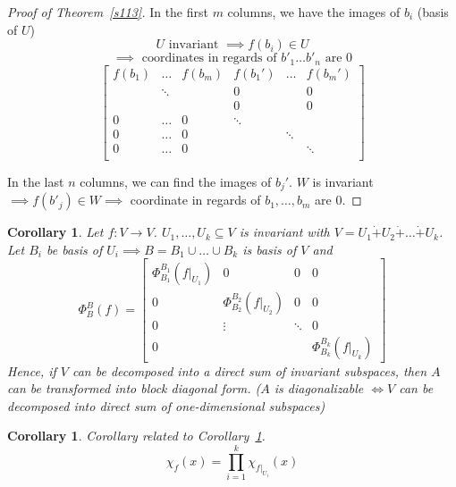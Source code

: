 \documentclass{article}
\newcounter{lecref}[section]
\numberwithin{lecref}{section}
\newtheorem{corollary}[lecref]{Corollary}
\begin{document}
\begin{proof}[Proof of Theorem~\ref{s113}]\hfill{}
  In the first $m$ columns, we have the images of $b_i$ (basis of $U$)
  \[ U \text{ invariant } \implies f(b_i) \in U \]
  \[ \implies \text{ coordinates in regards of } b'_1 \dots b'_n \text{ are } 0 \]
  \[
    \begin{bmatrix}
      f(b_1) & \dots  & f(b_m) & f(b_1') & \dots  & f(b_m') \\
             & \ddots &        & 0       &        & 0 \\
             &        &        & 0       &        & 0 \\
      0      & \dots  & 0      & \ddots  &        & \\
      0      & \dots  & 0      &         & \ddots & \\
      0      & \dots  & 0      &         &        & \ddots \\
    \end{bmatrix}
  \]

  In the last $n$ columns, we can find the images of $b_j'$.
  $W$ is invariant $\implies f(b'_j) \in W \implies$ coordinate in regards of $b_1, \dots, b_m$ are $0$.
\end{proof}

\begin{corollary} %
  \label{k116}
  Let $f: V \to V$. $U_1, \dots, U_k \subseteq V$ is invariant with $V = U_1 \dot+ U_2 \dot+ \dots \dot+ U_k$.
  Let $B_i$ be basis of $U_i \implies B = B_1 \cup \dots \cup B_k$ is basis of $V$ and
  \[
    \Phi_B^B(f) = \left[\begin{array}{c|ccc}
      \Phi_{B_1}^{B_1}(f|_{U_1}) & 0 & 0 & 0 \\
    \hline
      0 & \Phi_{B_2}^{B_2}(f|_{U_2}) & 0 & 0 \\
      0 & \vdots & \ddots & 0 \\
      0 &   &  & \Phi_{B_k}^{B_k}(f|_{U_k})
    \end{array}\right]
  \]
  Hence, if $V$ can be decomposed into a direct sum of invariant subspaces, then $A$ can be transformed into block diagonal form.
  ($A$ is diagonalizable $\iff V$ can be decomposed into direct sum of one-dimensional subspaces)
\end{corollary}

\begin{corollary} %
  Corollary related to Corollary~\ref{k116}.
  \[ \chi_f(x) = \prod_{i=1}^k \chi_{f|_{U_i}}(x) \]
\end{corollary}
\end{document}
